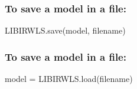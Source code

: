 \subsubsection*{To save a model in a file\+:}

\begin{DoxyVerb}    LIBIRWLS.save(model, filename)
\end{DoxyVerb}


\subsubsection*{To save a model in a file\+:}

\begin{DoxyVerb}    model = LIBIRWLS.load(filename)\end{DoxyVerb}
 